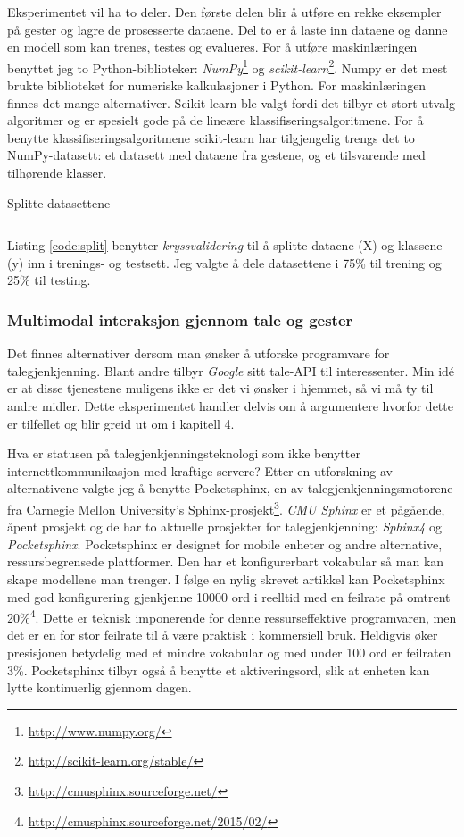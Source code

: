 Eksperimentet vil ha to deler. Den første delen blir å utføre en rekke eksempler på gester og lagre de prosesserte dataene. Del to er å laste inn dataene og danne en modell som kan trenes, testes og evalueres. For å utføre maskinlæringen benyttet jeg to Python-biblioteker: \emph{NumPy}\footnote{\url{http://www.numpy.org/}} og \emph{scikit-learn}\footnote{\url{http://scikit-learn.org/stable/}}. Numpy er det mest brukte biblioteket for numeriske kalkulasjoner i Python. For maskinlæringen finnes det mange alternativer. Scikit-learn ble valgt fordi det tilbyr et stort utvalg algoritmer og er spesielt gode på de lineære klassifiseringsalgoritmene. For å benytte klassifiseringsalgoritmene scikit-learn har tilgjengelig trengs det to NumPy-datasett: et datasett med dataene fra gestene, og et tilsvarende med tilhørende klasser.
\begin{listing}[ht]
\caption{Splitte datasettene}
\inputminted[fontsize=\footnotesize]{python}{kodesnutter/split_data.py}
\label{code:split}
\end{listing}
Listing \ref{code:split} benytter \emph{kryssvalidering} til å splitte dataene (X) og klassene (y) inn i trenings- og testsett. Jeg valgte å dele datasettene i 75\% til trening og 25\% til testing.\\

\subsubsection{Multimodal interaksjon gjennom tale og gester}
\label{ch:multimodalimpl}
Det finnes alternativer dersom man ønsker å utforske programvare for talegjenkjenning. Blant andre tilbyr \emph{Google} sitt tale-API til interessenter. Min idé er at disse tjenestene muligens ikke er det vi ønsker i hjemmet, så vi må ty til andre midler. Dette eksperimentet handler delvis om å argumentere hvorfor dette er tilfellet og blir greid ut om i kapitell 4. 

Hva er statusen på talegjenkjenningsteknologi som ikke benytter internettkommunikasjon med kraftige servere? Etter en utforskning av alternativene valgte jeg å benytte Pocketsphinx, en av talegjenkjenningsmotorene fra Carnegie Mellon University's Sphinx-prosjekt\footnote{\url{http://cmusphinx.sourceforge.net/}}. \emph{CMU Sphinx} er et pågående, åpent prosjekt og de har to aktuelle prosjekter for talegjenkjenning: \emph{Sphinx4} og \emph{Pocketsphinx}. Pocketsphinx er designet for mobile enheter og andre alternative, ressursbegrensede plattformer. Den har et konfigurerbart vokabular så man kan skape modellene man trenger. I følge en nylig skrevet artikkel kan Pocketsphinx med god konfigurering gjenkjenne 10000 ord i reelltid med en feilrate på omtrent 20\%\footnote{\url{http://cmusphinx.sourceforge.net/2015/02/}}. Dette er teknisk imponerende for denne ressurseffektive programvaren, men det er en for stor feilrate til å være praktisk i kommersiell bruk. Heldigvis øker presisjonen betydelig med et mindre vokabular og med under 100 ord er feilraten 3\%. Pocketsphinx tilbyr også å benytte et aktiveringsord, slik at enheten kan lytte kontinuerlig gjennom dagen.

